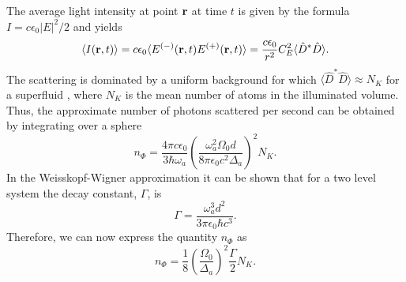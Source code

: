 The average light intensity at point $\mathbf{r}$ at time $t$ is given
by the formula $I = c \epsilon_0 |E|^2/2$ and yields
\begin{equation}
  \langle I (\mathbf{r}, t) \rangle = c \epsilon_0 \langle
  E^{(-)} (\mathbf{r}, t) E^{(+)} (\mathbf{r}, t) \rangle =
  \frac{c \epsilon_0}{r^2} C_E^2 \langle \hat{D}^* \hat{D} \rangle.
\end{equation}
The scattering is dominated by a uniform background for which $\langle
\hat{D}^* \hat{D} \rangle \approx N_K$ for a superfluid
\cite{mekhov2012}, where $N_K$ is the mean number of atoms in the
illuminated volume. Thus, the approximate number of photons scattered
per second can be obtained by integrating over a sphere
\begin{equation}
  n_{\Phi} = \frac{4 \pi c \epsilon_0}{3 \hbar \omega_a} \left(\frac{\omega_a^2
      \Omega_0 d}{8 \pi \epsilon_0 c^2 \Delta_a}\right)^2 N_K.
\end{equation}
In the Weisskopf-Wigner approximation it can be shown \cite{Scully}
that for a two level system the decay constant, $\Gamma$, is
\begin{equation}
  \Gamma = \frac{\omega_a^3 d^2}{3 \pi \epsilon_0 \hbar c^3}.
\end{equation}
Therefore, we can now express the quantity $n_{\Phi}$ as
\begin{equation}
  n_{\Phi} = \frac{1}{8} \left(\frac{\Omega_0}{\Delta_a}\right)^2 \frac{\Gamma}{2} N_K.
\end{equation}
